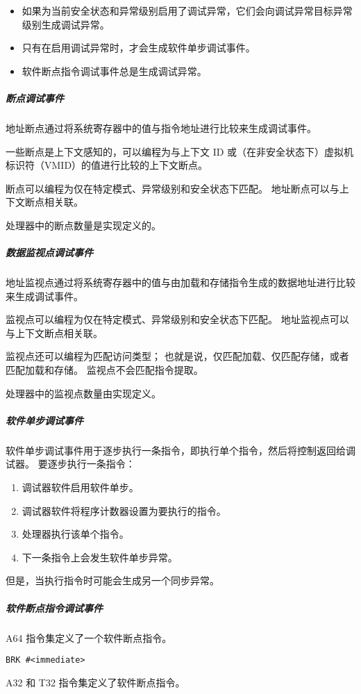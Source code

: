 \begin{itemize}
\item
  如果为当前安全状态和异常级别启用了调试异常，它们会向调试异常目标异常级别生成调试异常。
\item
  只有在启用调试异常时，才会生成软件单步调试事件。
\item
  软件断点指令调试事件总是生成调试异常。
\end{itemize}

\subparagraph*{断点调试事件}

地址断点通过将系统寄存器中的值与指令地址进行比较来生成调试事件。

一些断点是上下文感知的，可以编程为与上下文 ID 或（在非安全状态下）虚拟机标识符（VMID）的值进行比较的上下文断点。

断点可以编程为仅在特定模式、异常级别和安全状态下匹配。
地址断点可以与上下文断点相关联。

处理器中的断点数量是实现定义的。

\subparagraph*{数据监视点调试事件}

地址监视点通过将系统寄存器中的值与由加载和存储指令生成的数据地址进行比较来生成调试事件。

监视点可以编程为仅在特定模式、异常级别和安全状态下匹配。
地址监视点可以与上下文断点相关联。

监视点还可以编程为匹配访问类型；
也就是说，仅匹配加载、仅匹配存储，或者匹配加载和存储。
监视点不会匹配指令提取。

处理器中的监视点数量由实现定义。

\subparagraph*{软件单步调试事件}

软件单步调试事件用于逐步执行一条指令，即执行单个指令，然后将控制返回给调试器。
要逐步执行一条指令：

\begin{enumerate}
\item
  调试器软件启用软件单步。
\item
  调试器软件将程序计数器设置为要执行的指令。
\item
  处理器执行该单个指令。
\item
  下一条指令上会发生软件单步异常。
\end{enumerate}

但是，当执行指令时可能会生成另一个同步异常。

\subparagraph*{软件断点指令调试事件}

A64 指令集定义了一个软件断点指令。

\lstinline!BRK #<immediate>!

A32 和 T32 指令集定义了软件断点指令。

